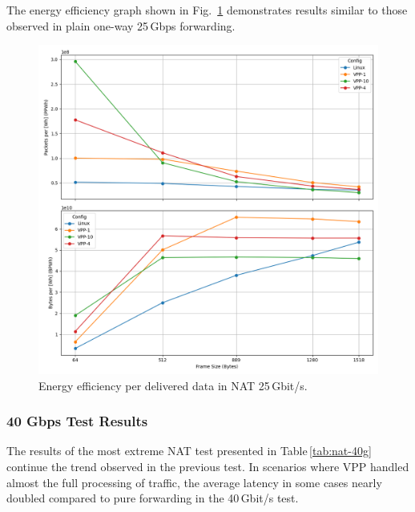 The energy efficiency graph shown in Fig.~\ref{fig:nat-25g} demonstrates results similar to those observed in plain one-way 25\,Gbps forwarding.

\begin{figure}[!htbp]
    \centering
    \includegraphics[width=\linewidth]{images/consumption-nat-25g.png}
    \caption{Energy efficiency per delivered data in NAT 25\,Gbit/s.}
    \label{fig:nat-25g}
\end{figure}





\subsubsection{40 Gbps Test Results}

The results of the most extreme NAT test presented in Table \ref{tab:nat-40g} continue the trend observed in the previous test.
In scenarios where VPP handled almost the full processing of traffic, the average latency in some cases nearly doubled compared to pure forwarding in the 40 Gbit/s test.

